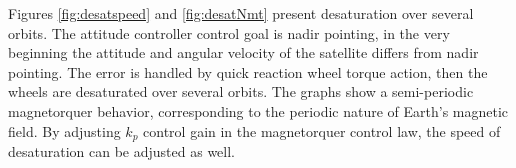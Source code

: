 Figures \ref{fig:desatspeed} and \ref{fig:desatNmt} present desaturation over several orbits. The attitude controller control goal is nadir pointing, in the very beginning the attitude and angular velocity of the satellite differs from nadir pointing. The error is handled by quick reaction wheel torque action, then the wheels are desaturated over several orbits. The graphs show a semi-periodic magnetorquer behavior, corresponding to the periodic nature of Earth's magnetic field. By adjusting $k_p$ control gain in the magnetorquer control law, the speed of desaturation can be adjusted as well.




%
		
		

		
		
		

		

